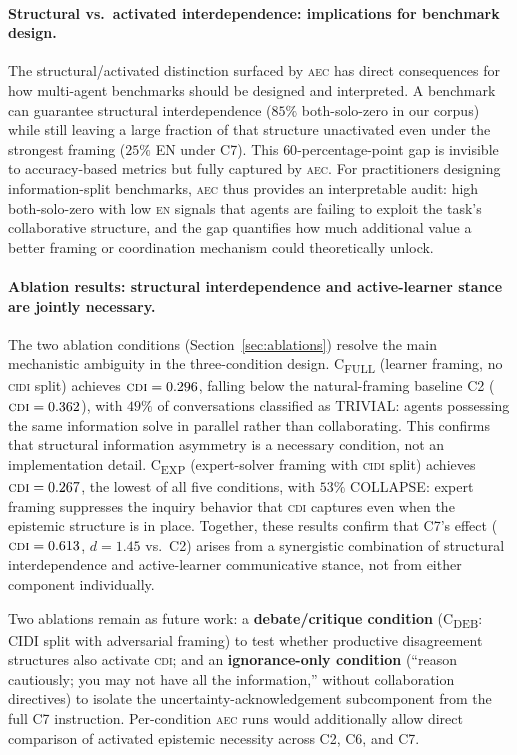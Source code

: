 \documentclass{article}
\newcommand{\CDI}{\textsc{cdi}}
\newcommand{\CIDI}{\textsc{cidi}}
\newcommand{\AEC}{\textsc{aec}}
\newcommand{\EN}{\textsc{en}}
\begin{document}
\paragraph{Structural vs.\ activated interdependence: implications for benchmark design.}
The structural/activated distinction surfaced by \AEC{} has direct
consequences for how multi-agent benchmarks should be designed and
interpreted. A benchmark can guarantee structural interdependence
($85\%$ both-solo-zero in our corpus) while still leaving a large
fraction of that structure unactivated even under the strongest framing
($25\%$ EN under C7). This $60$-percentage-point gap is invisible to
accuracy-based metrics but fully captured by \AEC{}. For practitioners
designing information-split benchmarks, \AEC{} thus provides an
interpretable audit: high both-solo-zero with low \EN{} signals that
agents are failing to exploit the task's collaborative structure, and
the gap quantifies how much additional value a better framing or
coordination mechanism could theoretically unlock.

\paragraph{Ablation results: structural interdependence and active-learner stance are jointly necessary.}
\label{sec:future_ablations}
The two ablation conditions (Section~\ref{sec:ablations}) resolve the
main mechanistic ambiguity in the three-condition design.
C\textsubscript{FULL} (learner framing, no \CIDI{} split) achieves
$\CDI = 0.296$, falling below the natural-framing baseline C2
($\CDI = 0.362$), with $49\%$ of conversations classified as TRIVIAL:
agents possessing the same information solve in parallel rather than
collaborating. This confirms that structural information asymmetry is
a necessary condition, not an implementation detail. C\textsubscript{EXP}
(expert-solver framing with \CIDI{} split) achieves $\CDI = 0.267$, the
lowest of all five conditions, with $53\%$ COLLAPSE: expert framing
suppresses the inquiry behavior that \CDI{} captures even when the
epistemic structure is in place. Together, these results confirm that
C7's effect ($\CDI = 0.613$, $d = 1.45$ vs.\ C2) arises from a
synergistic combination of structural interdependence and active-learner
communicative stance, not from either component individually.

Two ablations remain as future work: a \textbf{debate/critique condition}
(C\textsubscript{DEB}: CIDI split with adversarial framing) to test
whether productive disagreement structures also activate \CDI; and an
\textbf{ignorance-only condition} (``reason cautiously; you may not have
all the information,'' without collaboration directives) to isolate the
uncertainty-acknowledgement subcomponent from the full C7 instruction.
Per-condition \AEC{} runs would additionally allow direct comparison of
activated epistemic necessity across C2, C6, and C7.
\end{document}
